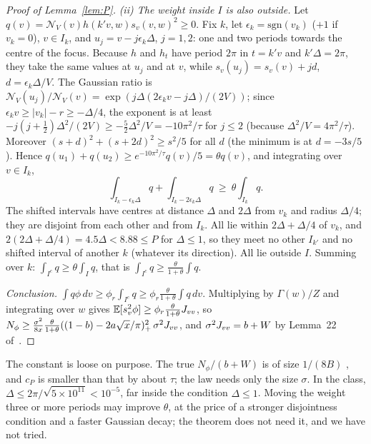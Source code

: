 \begin{proof}[Proof of Lemma~\ref{lem:P}]
\emph{(ii) The weight inside $I$ is also outside.}
Let $q(v)=\mathcal N_V(v)h(k'v,w)s_v(v,w)^2\ge0$.
Fix $k$, let $\epsilon_k=\mathrm{sgn}(v_k)$ ($+1$ if $v_k=0$), $v\in I_k$, and $u_j=v-j\epsilon_k\Delta$, $j=1,2$: one and two periods towards the centre of the focus.
Because $h$ and $h_t$ have period $2\pi$ in $t=k'v$ and $k'\Delta=2\pi$, they take the same values at $u_j$ and at $v$, while $s_v(u_j)=s_v(v)+jd$, $d=\epsilon_k\Delta/V$.
The Gaussian ratio is $\mathcal N_V(u_j)/\mathcal N_V(v)=\exp(j\Delta(2\epsilon_kv-j\Delta)/(2V))$; since $\epsilon_kv\ge|v_k|-r\ge-\Delta/4$, the exponent is at least $-j(j+\tfrac12)\Delta^2/(2V)\ge-\tfrac52\Delta^2/V=-10\pi^2/\tau$ for $j\le2$ (because $\Delta^2/V=4\pi^2/\tau$).
Moreover $(s+d)^2+(s+2d)^2\ge s^2/5$ for all $d$ (the minimum is at $d=-3s/5$).
Hence $q(u_1)+q(u_2)\ge e^{-10\pi^2/\tau}q(v)/5=\theta q(v)$, and integrating over $v\in I_k$,
\begin{equation}
\int_{I_k-\epsilon_k\Delta}q+\int_{I_k-2\epsilon_k\Delta}q\ \ge\ \theta\int_{I_k}q .
\end{equation}
The shifted intervals have centres at distance $\Delta$ and $2\Delta$ from $v_k$ and radius $\Delta/4$; they are disjoint from each other and from $I_k$.
All lie within $2\Delta+\Delta/4$ of $v_k$, and $2(2\Delta+\Delta/4)=4.5\Delta<8.88\le P$ for $\Delta\le1$, so they meet no other $I_{k'}$ and no shifted interval of another $k$ (whatever its direction).
All lie outside $I$.
Summing over $k$: $\int_{I^c}q\ge\theta\int_Iq$, that is $\int_{I^c}q\ge\frac\theta{1+\theta}\int q$.

\emph{Conclusion.}
$\int q\phi\,dv\ge\phi_r\int_{I^c}q\ge\phi_r\frac\theta{1+\theta}\int q\,dv$.
Multiplying by $\Gamma(w)/Z$ and integrating over $w$ gives $\mathbb{E}[s_v^2\phi]\ge\phi_r\frac\theta{1+\theta}J_{vv}$, so
$N_\phi\ge\frac{\sigma^2}{8x}\frac\theta{1+\theta}((1-b)-2a\sqrt x/\pi)_+^2\,\sigma^2J_{vv}$, and $\sigma^2J_{vv}=b+W$ by Lemma~22 of~\cite{F}.
\end{proof}

The constant is loose on purpose.
The true $N_\phi/(b+W)$ is of size $1/(8B)$ \numst, and $c_P$ is smaller than that by about $\tau$; the law needs only the size $\sigma$.
In the class, $\Delta\le2\pi/\sqrt{5\times10^{11}}<10^{-5}$, far inside the condition $\Delta\le1$.
Moving the weight three or more periods may improve $\theta$, at the price of a stronger disjointness condition and a faster Gaussian decay; the theorem does not need it, and we have not tried.

